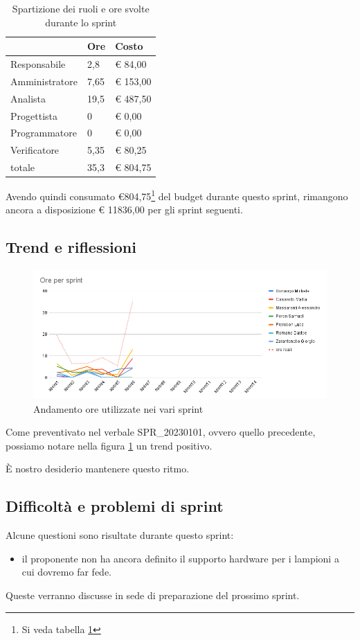 \begin{table}[ht]
    \begin{tabularx}{\linewidth}{X|l|l}
    \rowcolor{gray!30}& Ore & Costo \\
    \hline
    
    Responsabile & 2,8 & € 84,00 \\
    \rowcolor{gray!10}Amministratore & 7,65 & € 153,00 \\
    Analista & 19,5 & € 487,50 \\
    \rowcolor{gray!10}Progettista & 0 & € 0,00 \\
    Programmatore & 0 & € 0,00 \\
    \rowcolor{gray!10}Verificatore & 5,35 &€ 80,25 \\
    totale & 35,3 & € 804,75 \\
    \end{tabularx}
    \caption{\label{costi-ruolo}Spartizione dei ruoli e ore svolte durante lo sprint}
\end{table}


Avendo quindi consumato €804,75\footnote{Si veda tabella \ref{costi-ruolo}} del budget durante questo sprint, rimangono ancora a disposizione € 11836,00 per gli sprint seguenti.

\subsection{Trend e riflessioni}

\begin{figure}[ht]
    \includegraphics[width=\linewidth]{img/andamento.png}
    \caption{Andamento ore utilizzate nei vari sprint}\label{img:andamento}
\end{figure}

Come preventivato nel verbale SPR\_20230101, ovvero quello precedente, possiamo notare nella figura \ref{img:andamento} un trend positivo.

È nostro desiderio mantenere questo ritmo.

\subsection{Difficoltà e problemi di sprint}

Alcune questioni sono risultate durante questo sprint:

\begin{itemize}
    \item il proponente non ha ancora definito il supporto hardware per i lampioni a cui dovremo far fede.
\end{itemize}

Queste verranno discusse in sede di preparazione del prossimo sprint.
